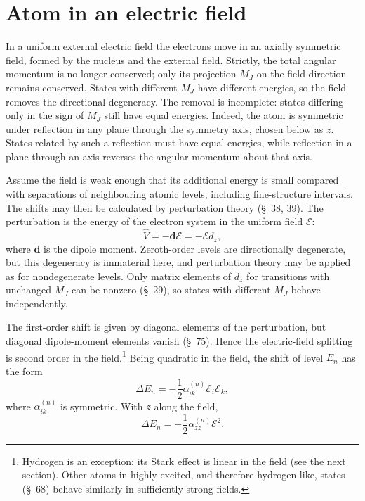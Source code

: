 \section{Atom in an electric field}



In a uniform external electric field the electrons move in an axially symmetric field, formed by the nucleus and the external field. Strictly, the total angular momentum is no longer conserved; only its projection $M_J$ on the field direction remains conserved. States with different $M_J$ have different energies, so the field removes the directional degeneracy. The removal is incomplete: states differing only in the sign of $M_J$ still have equal energies. Indeed, the atom is symmetric under reflection in any plane through the symmetry axis, chosen below as $z$. States related by such a reflection must have equal energies, while reflection in a plane through an axis reverses the angular momentum about that axis.

Assume the field is weak enough that its additional energy is small compared with separations of neighbouring atomic levels, including fine-structure intervals. The shifts may then be calculated by perturbation theory (\S~38, 39). The perturbation is the energy of the electron system in the uniform field $\boldsymbol{\mathcal E}$:
\begin{equation}\widehat V=-\mathbf d\boldsymbol{\mathcal E}=-\mathcal E d_z,\tag{76.1}\end{equation}
where $\mathbf d$ is the dipole moment. Zeroth-order levels are directionally degenerate, but this degeneracy is immaterial here, and perturbation theory may be applied as for nondegenerate levels. Only matrix elements of $d_z$ for transitions with unchanged $M_J$ can be nonzero (\S~29), so states with different $M_J$ behave independently.

The first-order shift is given by diagonal elements of the perturbation, but diagonal dipole-moment elements vanish (\S~75). Hence the electric-field splitting is second order in the field.\footnote{Hydrogen is an exception: its Stark effect is linear in the field (see the next section). Other atoms in highly excited, and therefore hydrogen-like, states (\S~68) behave similarly in sufficiently strong fields.} Being quadratic in the field, the shift of level $E_n$ has the form
\begin{equation}\Delta E_n=-\frac12\alpha_{ik}^{(n)}\mathcal E_i\mathcal E_k,\tag{76.2}\end{equation}
where $\alpha_{ik}^{(n)}$ is symmetric. With $z$ along the field,
\begin{equation}\Delta E_n=-\frac12\alpha_{zz}^{(n)}\mathcal E^2.\tag{76.3}\end{equation}

